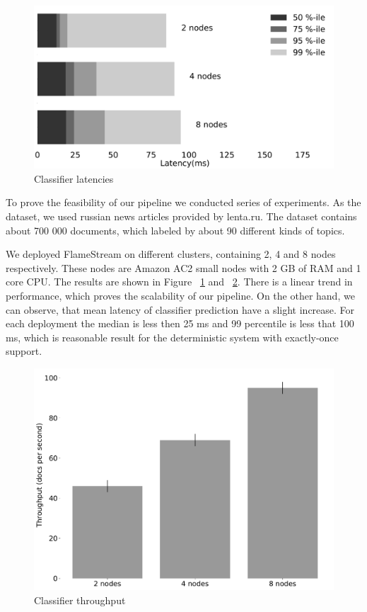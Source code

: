 \label {fs-short-experiments}

\begin{figure}[htbp]
  \centering
  \includegraphics[scale=0.1]{pics/classifier_latencies}
  \caption{Classifier latencies}
  \label {latencies}
\end{figure}

To prove the feasibility of our pipeline we conducted series of experiments. As the dataset, we used russian news articles provided by lenta.ru. The dataset contains about 700 000 documents, which labeled by about 90 different kinds of topics. 

We deployed FlameStream on different clusters, containing 2, 4 and 8 nodes respectively. These nodes are Amazon AC2 small nodes with 2 GB of RAM and 1 core CPU. The results are shown in Figure ~\ref{latencies} and ~\ref{throughput}. There is a linear trend in performance, which proves the scalability of our pipeline. On the other hand, we can observe, that mean latency of classifier prediction have a slight increase. For each deployment the median is less then 25 ms and 99 percentile is less that 100 ms, which is reasonable result for the deterministic system with exactly-once support.

\begin{figure}[htbp]
  \centering
  \includegraphics[scale=0.2]{pics/classifier_throughput}
  \caption{Classifier throughput}
  \label {throughput}
\end{figure}